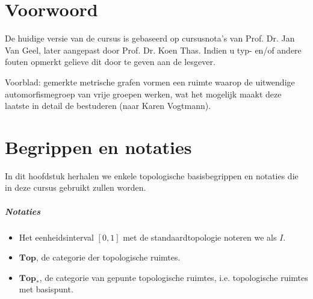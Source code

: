 \documentclass[12pt]{book}
\begin{document}




\chapter*{Voorwoord}

De huidige versie van de cursus is gebaseerd op cursusnota's van Prof. Dr. Jan Van Geel, later aangepast door Prof. Dr. Koen Thas. Indien u typ- en/of andere fouten opmerkt gelieve dit door te geven aan de lesgever.


Voorblad: gemerkte metrische grafen vormen een ruimte waarop de uitwendige automorfismegroep van vrije groepen werken, wat het mogelijk maakt deze laatste in detail de bestuderen (naar Karen Vogtmann).
\tableofcontents

\chapter{Begrippen en notaties}
In dit hoofdstuk herhalen we enkele topologische basisbegrippen en notaties die in deze cursus gebruikt zullen worden.

\paragraph{Notaties}
\begin{itemize}
\item Het eenheidsinterval $[0,1]$ met de standaardtopologie noteren we als $I$.
\item $\mathbf{Top}$, de categorie der topologische ruimtes.
\item $\mathbf{Top_*}$, de categorie van gepunte topologische ruimtes, i.e. topologische ruimtes met basispunt.
\end{itemize}
\end{document}
